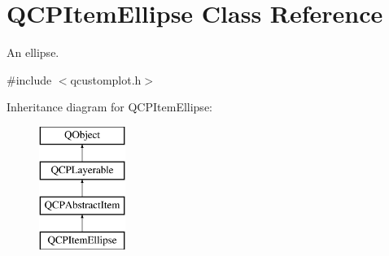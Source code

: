\hypertarget{class_q_c_p_item_ellipse}{}\section{Q\+C\+P\+Item\+Ellipse Class Reference}
\label{class_q_c_p_item_ellipse}


An ellipse.  




{\ttfamily \#include $<$qcustomplot.\+h$>$}

Inheritance diagram for Q\+C\+P\+Item\+Ellipse\+:\begin{figure}[H]
\begin{center}
\leavevmode
\includegraphics[height=4.000000cm]{da/d8f/class_q_c_p_item_ellipse}
\end{center}
\end{figure}
